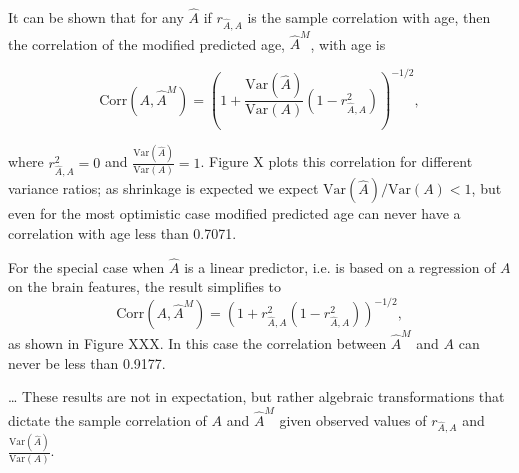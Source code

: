 \documentclass[40pt]{article}
\begin{document}
\hrulefill \\

It can be shown that for any $\hat{A}$ if $r_{\hat{A},A}$ is the sample correlation with age, then the correlation of the modified predicted age, $\hat{A}^M$, with age is

$$
\text{Corr}(A,\hat{A}^M)= \left(1 + \frac{\text{Var}(\hat{A})}{\text{Var}(A)}(1-r_{\hat{A},A}^2)\right)^{-1/2},
$$


\noindent where $r_{\hat{A},A}^2= 0$ and $\frac{\text{Var}(\hat{A})}{\text{Var}(A)} = 1$. Figure X plots this correlation for different variance ratios; as shrinkage is expected we expect $\text{Var}(\hat{A})/\text{Var}(A) < 1$, but even for the most optimistic case modified predicted age can never have a correlation with age less than 0.7071. 


For the special case when $\hat{A}$ is a linear predictor, i.e. is based on a regression of $A$ on the brain features, the result simplifies to
$$
\text{Corr}(A,\hat{A}^M)= \left(1 + r_{\hat{A},A}^2(1-r_{\hat{A},A}^2)\right)^{-1/2},
$$
as shown in Figure XXX. In this case the correlation between $\hat{A}^M$ and $A$ can never be less than 0.9177.

\dots
These results are not in expectation, but rather algebraic transformations that dictate the sample correlation of $A$ and $\hat{A}^M$ given observed values of $r_{\hat{A},A}$ and $\frac{\text{Var}(\hat{A})}{\text{Var}(A)}$.
\end{document}
